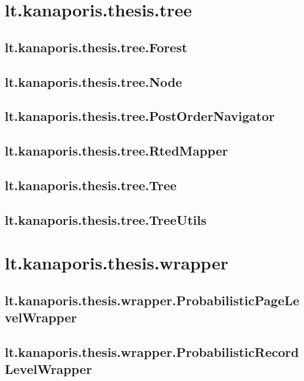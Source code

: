 \section{lt.kanaporis.thesis.tree}

\subsection{lt.kanaporis.thesis.tree.Forest}


\subsection{lt.kanaporis.thesis.tree.Node}


\subsection{lt.kanaporis.thesis.tree.PostOrderNavigator}


\subsection{lt.kanaporis.thesis.tree.RtedMapper}


\subsection{lt.kanaporis.thesis.tree.Tree}


\subsection{lt.kanaporis.thesis.tree.TreeUtils}



\section{lt.kanaporis.thesis.wrapper}

\subsection{lt.kanaporis.thesis.wrapper.ProbabilisticPageLevelWrapper}


\subsection{lt.kanaporis.thesis.wrapper.ProbabilisticRecordLevelWrapper}



